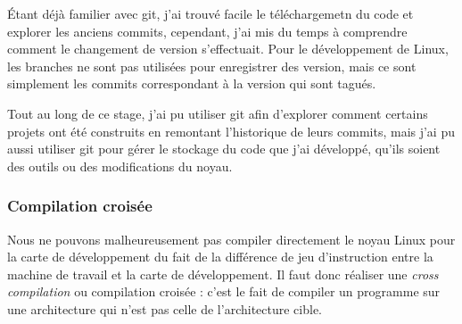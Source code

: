 Étant déjà familier avec git, j'ai trouvé facile le téléchargemetn du code et explorer les anciens commits, cependant, j'ai mis du temps à comprendre comment le changement de version s'effectuait. Pour le développement de Linux, les branches ne sont pas utilisées pour enregistrer des version, mais ce sont simplement les commits correspondant à la version qui sont tagués. 

Tout au long de ce stage, j'ai pu utiliser \gls{git} afin d'explorer comment certains projets ont été construits en remontant l'historique de leurs commits, mais j'ai pu aussi utiliser \gls{git} pour gérer le stockage du code que j'ai développé, qu'ils soient des outils ou des modifications du noyau.  


\subsubsection{Compilation croisée}
\label{sec:compilation-croisee}
Nous ne pouvons malheureusement pas compiler directement le noyau Linux pour la carte de développement du fait de la différence de jeu d'instruction entre la machine de travail et la carte de développement. Il faut donc réaliser une \textit{cross compilation} ou compilation croisée : c'est le fait de compiler un programme sur une architecture qui n'est pas celle de l'architecture cible.

